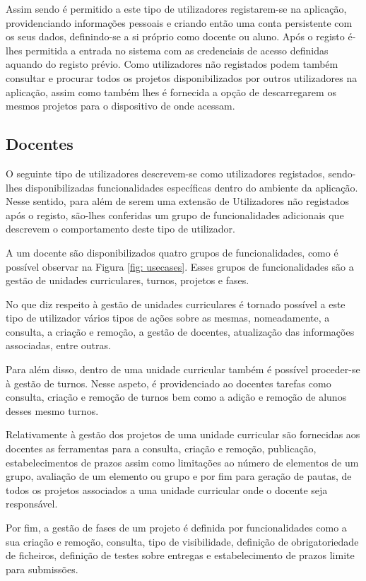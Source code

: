 Assim sendo é permitido a este tipo de utilizadores registarem-se na aplicação, providenciando informações
pessoais e criando então uma conta persistente com os seus dados, definindo-se a si próprio como
docente ou aluno. Após o registo é-lhes permitida a entrada no sistema com as credenciais de acesso
definidas aquando do registo prévio. Como utilizadores não registados podem também consultar e procurar
todos os projetos disponibilizados por outros utilizadores na aplicação, assim como também lhes é fornecida
a opção de descarregarem os mesmos projetos para o dispositivo de onde acessam.

\subsection{Docentes}

O seguinte tipo de utilizadores descrevem-se como utilizadores registados, sendo-lhes 
disponibilizadas funcionalidades específicas dentro do ambiente da aplicação. Nesse sentido, para 
além de serem uma extensão de Utilizadores não registados após o registo, são-lhes conferidas um
grupo de funcionalidades adicionais que descrevem o comportamento deste tipo de utilizador.

A um docente são disponibilizados quatro grupos de funcionalidades, como é possível observar na Figura
\ref{fig: usecases}. Esses grupos de funcionalidades são a gestão de unidades curriculares, turnos, 
projetos e fases.

No que diz respeito à gestão de unidades curriculares é tornado possível a este tipo 
de utilizador vários tipos de ações sobre as mesmas, nomeadamente, a consulta, a criação e 
remoção, a gestão de docentes, atualização das informações associadas, entre 
outras.

Para além disso, dentro de uma unidade curricular também é possível proceder-se 
à gestão de turnos. Nesse aspeto, é providenciado ao docentes tarefas como consulta, 
criação e remoção de turnos bem como a adição e remoção de alunos desses mesmo 
turnos.

Relativamente à gestão dos projetos de uma unidade curricular são fornecidas 
aos docentes as ferramentas para a consulta, criação e remoção, publicação, 
estabelecimentos de prazos assim como limitações ao número de elementos de um 
grupo, avaliação de um elemento ou grupo e por fim para geração de pautas, de 
todos os projetos associados a uma unidade curricular onde o docente seja 
responsável.

Por fim, a gestão de fases de um projeto é definida por funcionalidades como a 
sua criação e remoção, consulta, tipo de visibilidade, definição de 
obrigatoriedade de ficheiros, definição de testes sobre entregas e estabelecimento de prazos limite 
para submissões.

